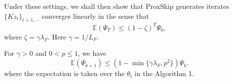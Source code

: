 Under these settings, we shall then show that ProxSkip generates iterates 
$\{Kz_t\}_{t = 1,\cdots}$ converges linearly in the sense that 
\begin{equation}
\mathbb{E}(\Psi_T) \leq (1 - \zeta)^T \Psi_0, 
\end{equation}
where $\zeta = \gamma \lambda_F$. Here $\gamma = 1/L_F$. 
%
\begin{theorem} 
For $\gamma > 0$ and $0 < p \leq 1$, we have 
\begin{equation} 
\mathbb{E}(\Psi_{k+1}) \leq (1 - \min \{ \gamma \lambda_F, p^2 \}) \Psi_k. 
\end{equation} 
where the expectation is taken over the $\theta_t$ in the Algorithm 1. 
\end{theorem}  
